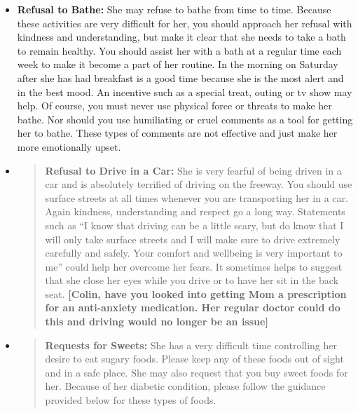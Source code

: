 \documentclass[]{article}
\begin{document}
\begin{itemize}
\item
  \textbf{Refusal to Bathe:} She may refuse to bathe from time to time.
  Because these activities are very difficult for her, you should
  approach her refusal with kindness and understanding, but make it
  clear that she needs to take a bath to remain healthy. You should
  assist her with a bath at a regular time each week to make it become a
  part of her routine. In the morning on Saturday after she has had
  breakfast is a good time because she is the most alert and in the best
  mood. An incentive such as a special treat, outing or tv show may
  help. Of course, you must never use physical force or threats to make
  her bathe. Nor should you use humiliating or cruel comments as a tool
  for getting her to bathe. These types of comments are not effective
  and just make her more emotionally upset.
\end{itemize}

\begin{itemize}
\item
  \begin{quote}
  \textbf{Refusal to Drive in a Car:} She is very fearful of being
  driven in a car and is absolutely terrified of driving on the freeway.
  You should use surface streets at all times whenever you are
  transporting her in a car. Again kindness, understanding and respect
  go a long way. Statements such as ``I know that driving can be a
  little scary, but do know that I will only take surface streets and I
  will make sure to drive extremely carefully and safely. Your comfort
  and wellbeing is very important to me'' could help her overcome her
  fears. It sometimes helps to suggest that she close her eyes while you
  drive or to have her sit in the back seat. \textbf{{[}Colin, have you
  looked into getting Mom a prescription for an anti-anxiety medication.
  Her regular doctor could do this and driving would no longer be an
  issue{]}}
  \end{quote}
\end{itemize}

\begin{itemize}
\item
  \begin{quote}
  \textbf{Requests for Sweets:} She has a very difficult time
  controlling her desire to eat sugary foods. Please keep any of these
  foods out of sight and in a safe place. She may also request that you
  buy sweet foods for her. Because of her diabetic condition, please
  follow the guidance provided below for these types of foods.
  \end{quote}
\end{itemize}
\end{document}
